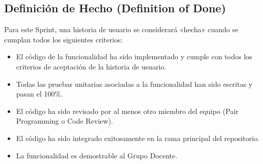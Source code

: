 \documentclass[12pt]{article}
\begin{document}
\pagebreak

\subsection{Definición de Hecho (Definition of Done)}

Para este Sprint, una historia de usuario se considerará «hecha» cuando se cumplan todos los siguientes criterios:

\begin{itemize}
	\item El código de la funcionalidad ha sido implementado y cumple con todos los criterios de aceptación de la historia de usuario.
	\item Todas las pruebas unitarias asociadas a la funcionalidad han sido escritas y pasan el 100\%.
	\item El código ha sido revisado por al menos otro miembro del equipo (Pair Programming o Code Review).
	\item El código ha sido integrado exitosamente en la rama principal del repositorio.
	\item La funcionalidad es demostrable al Grupo Docente.
\end{itemize}
\end{document}
